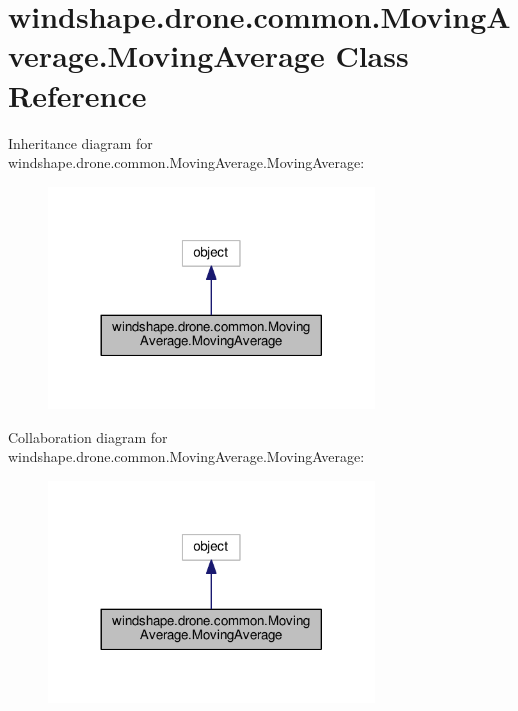 \hypertarget{classwindshape_1_1drone_1_1common_1_1_moving_average_1_1_moving_average}{}\section{windshape.\+drone.\+common.\+Moving\+Average.\+Moving\+Average Class Reference}
\label{classwindshape_1_1drone_1_1common_1_1_moving_average_1_1_moving_average}


Inheritance diagram for windshape.\+drone.\+common.\+Moving\+Average.\+Moving\+Average\+:\nopagebreak
\begin{figure}[H]
\begin{center}
\leavevmode
\includegraphics[width=245pt]{classwindshape_1_1drone_1_1common_1_1_moving_average_1_1_moving_average__inherit__graph}
\end{center}
\end{figure}


Collaboration diagram for windshape.\+drone.\+common.\+Moving\+Average.\+Moving\+Average\+:\nopagebreak
\begin{figure}[H]
\begin{center}
\leavevmode
\includegraphics[width=245pt]{classwindshape_1_1drone_1_1common_1_1_moving_average_1_1_moving_average__coll__graph}
\end{center}
\end{figure}
